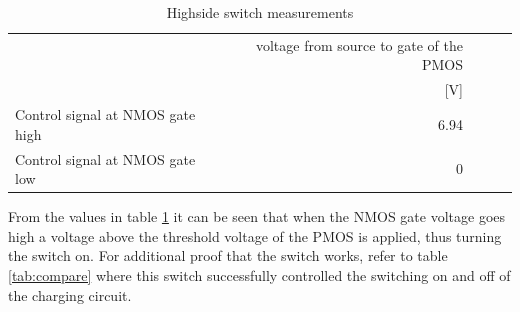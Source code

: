 \begin{table}[!htb]
        \centering
        \footnotesize
        \caption{Highside switch measurements}
         \begin{tabular}{lrrrr}
          \toprule
             & voltage from source to gate of the PMOS \\
             &  [V] \\
          \midrule
          Control signal at NMOS gate high &     6.94\\
          Control signal at NMOS gate low  &   0\\
         

          \bottomrule
        \end{tabular}
     \label{tab:PMOSmeas}
\end{table}
From the values in table \ref{tab:PMOSmeas} it can be seen that when the NMOS gate voltage goes high a voltage above the threshold voltage of the PMOS is applied, thus turning the switch on. For additional proof that the switch works, refer to table \ref{tab:compare} where this switch successfully controlled the switching on and off of the charging circuit.
\newpage
